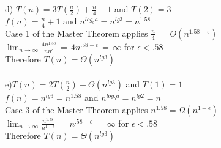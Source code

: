 \documentclass{article}
\newcommand\blankpage{%
    \null
    \thispagestyle{empty}%
    \addtocounter{page}{-1}%
    \newpage}
\begin{document}
d) $T(n)=3T(\frac{n}{2})+\frac{n}{4}+1$ and $T(2)=3$\\
$f(n)=\frac{n}{4}+1$ and $n^{log_ba}=n^{lg3}=n^{1.58}$\\
Case 1 of the Master Theorem applies $\frac{n}{4}\,=\,O(n^{1.58-\epsilon})$\\
$\lim_{n \to \infty}\frac{4n^{1.58}}{nn^{\epsilon}}\,=\,4n^{.58-\epsilon}\,=\,\infty$ for $\epsilon<.58$\\
Therefore $T(n)=\Theta(n^{lg3})$\\\\
e)$T(n)=2T(\frac{n}{2})+\Theta(n^{lg3})$ and $T(1)=1$\\
$f(n)=n^{lg3}=n^{1.58}$ and $n^{log_ba}=n^{lg2}=n$\\
Case 3 of the Master Theorem applies $n^{1.58}=\Omega(n^{1+\epsilon})$\\
$\lim_{n \to \infty}\frac{n^{1.58}}{n^{1+\epsilon}}\,=\,n^{.58-\epsilon}\,=\,\infty$ for $\epsilon<.58$\\
Therefore $T(n)=\Theta(n^{lg3})$
\afterpage{\blankpage}
\afterpage{\blankpage}
\afterpage{\blankpage}
\afterpage{\blankpage}
\end{document}
